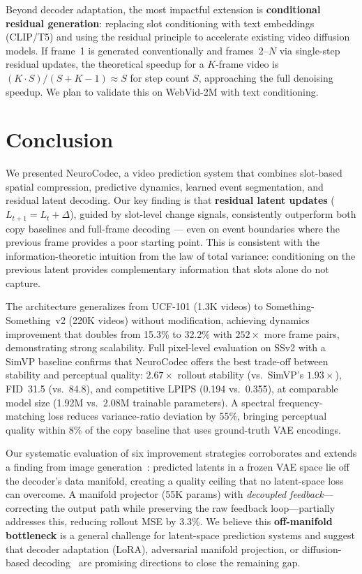 \documentclass{article}
\newcommand{\method}{NeuroCodec}
\begin{document}
Beyond decoder adaptation, the most impactful extension is
\textbf{conditional residual generation}:
replacing slot conditioning with text embeddings (CLIP/T5) and using the
residual principle to accelerate existing video diffusion models.
If frame~1 is generated conventionally and frames~2--$N$ via
single-step residual updates, the theoretical speedup for a $K$-frame
video is $(K \cdot S) / (S + K - 1) \approx S$ for step count $S$,
approaching the full denoising speedup.
We plan to validate this on WebVid-2M with text conditioning.

\section{Conclusion}
\label{sec:conclusion}

We presented \method{}, a video prediction system that combines
slot-based spatial compression, predictive dynamics, learned event
segmentation, and residual latent decoding.
Our key finding is that \textbf{residual latent updates}
($L_{t+1} = L_t + \Delta$), guided by slot-level change signals,
consistently outperform both copy baselines and full-frame decoding ---
even on event boundaries where the previous frame provides a poor
starting point.
This is consistent with the information-theoretic intuition from the
law of total variance: conditioning on the previous latent provides
complementary information that slots alone do not capture.

The architecture generalizes from UCF-101 (1.3K videos) to
Something-Something~v2 (220K videos) without modification, achieving
dynamics improvement that doubles from 15.3\% to 32.2\% with
$252\times$ more frame pairs, demonstrating strong scalability.
Full pixel-level evaluation on SSv2 with a SimVP baseline confirms
that \method{} offers the best trade-off between stability and
perceptual quality: $2.67\times$ rollout stability (vs.\ SimVP's
$1.93\times$), FID~31.5 (vs.\ 84.8), and competitive LPIPS (0.194
vs.\ 0.355), at comparable model size (1.92M vs.\ 2.08M trainable
parameters).
A spectral frequency-matching loss reduces variance-ratio deviation
by 55\%, bringing perceptual quality within 8\% of the copy baseline
that uses ground-truth VAE encodings.

Our systematic evaluation of six improvement strategies corroborates
and extends a finding from image generation~\cite{zheng2025raedit}:
predicted latents in a frozen VAE space lie off the decoder's data
manifold, creating a quality ceiling that no latent-space loss can
overcome.
A manifold projector (55K params) with \emph{decoupled feedback}---correcting
the output path while preserving the raw feedback loop---partially
addresses this, reducing rollout MSE by 3.3\%.
We believe this \textbf{off-manifold bottleneck} is a general challenge
for latent-space prediction systems and suggest that decoder adaptation
(LoRA), adversarial manifold projection, or diffusion-based
decoding~\cite{heek2026unified} are promising directions to close
the remaining gap.
\end{document}
